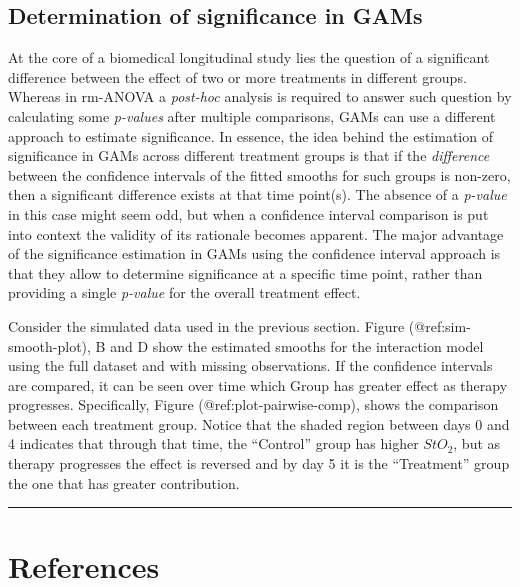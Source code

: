 \documentclass[
]{article}
\begin{document}
\hypertarget{determination-of-significance-in-gams}{%
\subsection{Determination of significance in GAMs}\label{determination-of-significance-in-gams}}

At the core of a biomedical longitudinal study lies the question of a significant difference between the effect of two or more treatments in different groups. Whereas in rm-ANOVA a \emph{post-hoc} analysis is required to answer such question by calculating some \emph{p-values} after multiple comparisons, GAMs can use a different approach to estimate significance. In essence, the idea behind the estimation of significance in GAMs across different treatment groups is that if the \emph{difference} between the confidence intervals of the fitted smooths for such groups is non-zero, then a significant difference exists at that time point(s). The absence of a \emph{p-value} in this case might seem odd, but when a confidence interval comparison is put into context the validity of its rationale becomes apparent. The major advantage of the significance estimation in GAMs using the confidence interval approach is that they allow to determine significance at a specific time point, rather than providing a single \emph{p-value} for the overall treatment effect.

Consider the simulated data used in the previous section. Figure (@ref:sim-smooth-plot), B and D show the estimated smooths for the interaction model using the full dataset and with missing observations. If the confidence intervals are compared, it can be seen over time which Group has greater effect as therapy progresses. Specifically, Figure (@ref:plot-pairwise-comp), shows the comparison between each treatment group. Notice that the shaded region between days 0 and 4 indicates that through that time, the ``Control'' group has higher \(StO_2\), but as therapy progresses the effect is reversed and by day 5 it is the ``Treatment'' group the one that has greater contribution.

\begin{center}\rule{0.5\linewidth}{0.5pt}\end{center}

\newpage

\hypertarget{references}{%
\section{References}\label{references}}
\end{document}
